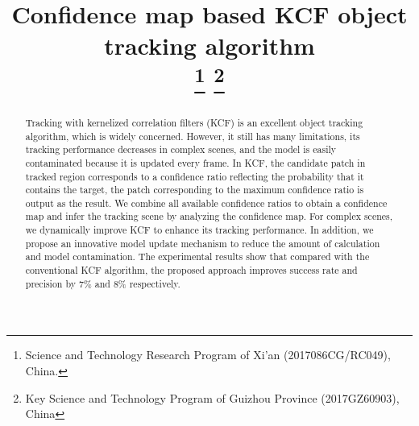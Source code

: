 \documentclass[conference]{IEEEtran}
\begin{document}
\title{Confidence map based KCF object tracking algorithm\\
\thanks{Science and Technology Research Program of Xi'an (2017086CG/RC049), China.}
\thanks{Key Science and Technology Program of Guizhou Province (2017GZ60903), China}
}

\author{
\and
{}
\and
{}
}

\maketitle

\begin{abstract}
Tracking with kernelized correlation filters (KCF) is an excellent object tracking algorithm, which is widely concerned.
However, it still has many limitations, its tracking performance decreases in complex scenes, and the model is easily contaminated because it is updated every frame.
In KCF, the candidate patch in tracked region corresponds to a confidence ratio reflecting the probability that it contains the target, the patch corresponding to the maximum confidence ratio is output as the result.
We combine all available confidence ratios to obtain a confidence map and infer the tracking scene by analyzing the confidence map.
For complex scenes, we dynamically improve KCF to enhance its tracking performance.
In addition, we propose an innovative model update mechanism to reduce the amount of calculation and model contamination. 
The experimental results show that compared with the conventional KCF algorithm, the proposed approach improves success rate and precision by 7\% and 8\% respectively.
\end{abstract}
\end{document}

